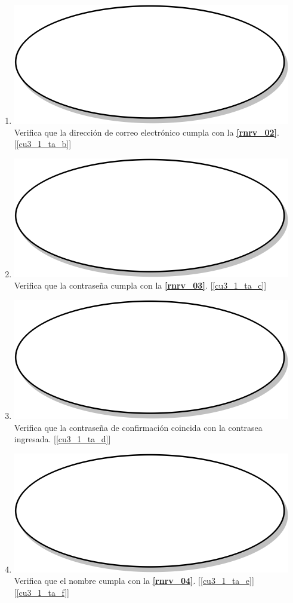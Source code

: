 \begin{enumerate}
  \item {\includegraphics[scale=.05]{Capitulo3/img/proceso.png} Verifica que la dirección de correo electrónico cumpla con la \textbf{\ref{rnrv_02}}. [\ref{cu3_1_ta_b}]}
  \item {\includegraphics[scale=.05]{Capitulo3/img/proceso.png} Verifica que la contraseña cumpla con la \textbf{\ref{rnrv_03}}. [\ref{cu3_1_ta_c}]}
  \item {\includegraphics[scale=.05]{Capitulo3/img/proceso.png} Verifica que la contraseña de confirmación coincida con la contrasea ingresada. [\ref{cu3_1_ta_d}]}
  \item {\includegraphics[scale=.05]{Capitulo3/img/proceso.png} Verifica que el nombre cumpla con la \textbf{\ref{rnrv_04}}. [\ref{cu3_1_ta_e}] [\ref{cu3_1_ta_f}]}

\end{enumerate}

